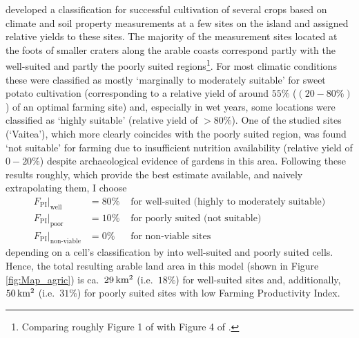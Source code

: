 \citet{Louwagie2006} developed a classification for successful cultivation of several crops based on climate and soil property measurements at a few sites on the island and assigned relative yields to these sites. 
The majority of the measurement sites located at the foots of smaller craters along the arable coasts correspond partly with the well-suited and partly the poorly suited regions\footnote{Comparing roughly Figure 1 of \citet{Louwagie2006} with Figure 4 of \citet{Puleston2017}.}. For most climatic conditions these were classified as mostly `marginally to moderately suitable' for sweet potato cultivation (corresponding to a relative yield of around $55\%$ ($(20-80\%)$) of an optimal farming site) and, especially in wet years, some locations were classified as `highly suitable' (relative yield of $>80\%$).
 One of the studied sites (`Vaitea'), which more clearly coincides with the poorly suited region, was found `not suitable' for farming due to insufficient nutrition availability (relative yield of $0-20\%$) despite archaeological evidence of gardens in this area.
 Following these results roughly, which provide the best estimate available, and naively extrapolating them, I choose
 \begin{eqnarray*}
 	F_\text{PI}|_\text{well} & = 80\% & \text{ for well-suited (highly to moderately suitable)}\\
 	F_\text{PI}|_\text{poor} & = 10\%  & \text{ for poorly suited (not suitable)}\\
 	F_\text{PI}|_\text{non-viable} & = 0\% & \text{ for non-viable sites}
 \end{eqnarray*}
 depending on a cell's classification by \citet{Puleston2017} into well-suited and poorly suited cells.
 Hence, the total resulting arable land area in this model (shown in Figure \ref{fig:Map_agric}) is ca.\ $29\,  {\rm km^2}$ (i.e.\ $18\%$) for well-suited sites and, additionally, $50\, {\rm km^2}$ (i.e.\ $31\%$) for poorly suited sites with low Farming Productivity Index.

